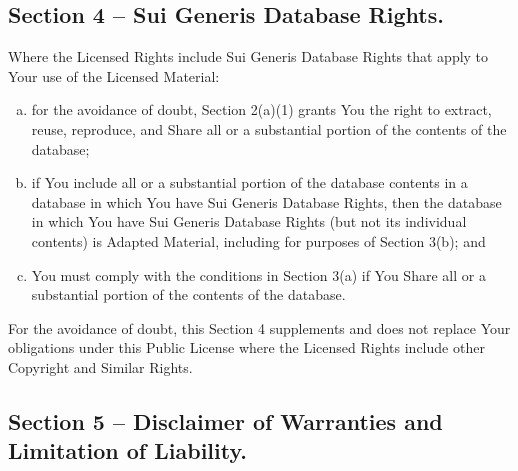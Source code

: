 {\subsection*{Section 4 -- Sui Generis Database Rights.}

Where the Licensed Rights include Sui Generis Database Rights that apply to Your use of the Licensed Material:

\begin{enumerate}[a.]
\item for the avoidance of doubt, Section 2(a)(1) grants You the right to extract, reuse, reproduce, and Share all or a substantial portion of the contents of the database;
\item if You include all or a substantial portion of the database contents in a database in which You have Sui Generis Database Rights, then the database in which You have Sui Generis Database Rights (but not its individual contents) is Adapted Material, including for purposes of Section 3(b); and
\item You must comply with the conditions in Section 3(a) if You Share all or a substantial portion of the contents of the database.
\end{enumerate}

For the avoidance of doubt, this Section 4 supplements and does not replace Your obligations under this Public License where the Licensed Rights include other Copyright and Similar Rights.

\subsection*{Section 5 -- Disclaimer of Warranties and Limitation of Liability.}

}
